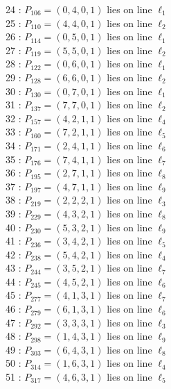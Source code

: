 \documentclass{article}
\begin{document}
{\begin{multicols}{2}
24 : $P_{106}=( 0, 4, 0, 1 )$ lies on line $\ell_{1}$\\
25 : $P_{110}=( 4, 4, 0, 1 )$ lies on line $\ell_{2}$\\
26 : $P_{114}=( 0, 5, 0, 1 )$ lies on line $\ell_{1}$\\
27 : $P_{119}=( 5, 5, 0, 1 )$ lies on line $\ell_{2}$\\
28 : $P_{122}=( 0, 6, 0, 1 )$ lies on line $\ell_{1}$\\
29 : $P_{128}=( 6, 6, 0, 1 )$ lies on line $\ell_{2}$\\
30 : $P_{130}=( 0, 7, 0, 1 )$ lies on line $\ell_{1}$\\
31 : $P_{137}=( 7, 7, 0, 1 )$ lies on line $\ell_{2}$\\
32 : $P_{157}=( 4, 2, 1, 1 )$ lies on line $\ell_{4}$\\
33 : $P_{160}=( 7, 2, 1, 1 )$ lies on line $\ell_{5}$\\
34 : $P_{171}=( 2, 4, 1, 1 )$ lies on line $\ell_{6}$\\
35 : $P_{176}=( 7, 4, 1, 1 )$ lies on line $\ell_{7}$\\
36 : $P_{195}=( 2, 7, 1, 1 )$ lies on line $\ell_{8}$\\
37 : $P_{197}=( 4, 7, 1, 1 )$ lies on line $\ell_{9}$\\
38 : $P_{219}=( 2, 2, 2, 1 )$ lies on line $\ell_{3}$\\
39 : $P_{229}=( 4, 3, 2, 1 )$ lies on line $\ell_{8}$\\
40 : $P_{230}=( 5, 3, 2, 1 )$ lies on line $\ell_{9}$\\
41 : $P_{236}=( 3, 4, 2, 1 )$ lies on line $\ell_{5}$\\
42 : $P_{238}=( 5, 4, 2, 1 )$ lies on line $\ell_{4}$\\
43 : $P_{244}=( 3, 5, 2, 1 )$ lies on line $\ell_{7}$\\
44 : $P_{245}=( 4, 5, 2, 1 )$ lies on line $\ell_{6}$\\
45 : $P_{277}=( 4, 1, 3, 1 )$ lies on line $\ell_{7}$\\
46 : $P_{279}=( 6, 1, 3, 1 )$ lies on line $\ell_{6}$\\
47 : $P_{292}=( 3, 3, 3, 1 )$ lies on line $\ell_{3}$\\
48 : $P_{298}=( 1, 4, 3, 1 )$ lies on line $\ell_{9}$\\
49 : $P_{303}=( 6, 4, 3, 1 )$ lies on line $\ell_{8}$\\
50 : $P_{314}=( 1, 6, 3, 1 )$ lies on line $\ell_{4}$\\
51 : $P_{317}=( 4, 6, 3, 1 )$ lies on line $\ell_{5}$\\

\end{multicols}}
\end{document}
